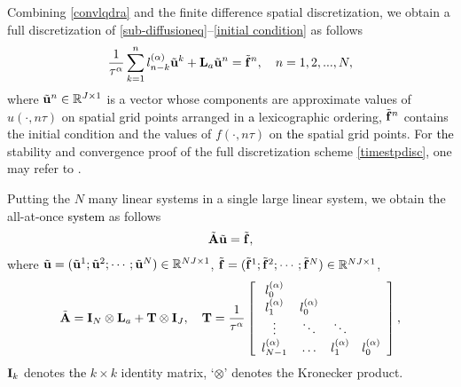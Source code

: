 \documentclass[11pt]{article}%
\numberwithin{equation}{section}
\begin{document}
Combining \eqref{convlqdra} and the finite difference spatial discretization, we obtain a full discretization of \eqref{sub-diffusioneq}--\eqref{initial condition} as follows
\begin{equation}\label{timestpdisc}
\frac{1}{\tau^\alpha}\sum\limits_{k=1}^{n}l_{n-k}^{(\alpha)}\tilde{\bf u}^k+{\bf L}_a\tilde{\bf u}^n=\tilde{\bf f}^n,\quad  n=1,2,...,N,
\end{equation}
where $\tilde{\bf u}^n\in\mathbb{R}^{J\times 1}$ is a vector whose components are approximate values of $u(\cdot,n\tau)$ on spatial grid points arranged in \textcolor{black}{a} lexicographic ordering, $\tilde{\bf f}^n$ contains the initial condition and the values of $f(\cdot,n\tau)$ on \textcolor{black}{the} spatial grid points. 
For \textcolor{black}{the} stability and convergence proof of the full discretization scheme \eqref{timestpdisc}, one may refer to \cite{zhang2011alternating,jin2016analysis,liao2018sharp}.

Putting the $N$ many linear systems in a single large linear system, we obtain the all-at-once \textcolor{black}{system} as follows
\begin{align}\label{allatoncesysts}
\tilde{\bf A}\tilde{\bf u}=\tilde{\bf f},
\end{align}
where $\tilde{\bf u}=(\tilde{\bf u}^{1};\tilde{\bf u}^{2};\cdots;\tilde{\bf u}^{N})\in\mathbb{R}^{NJ\times 1}$, $\tilde{\bf f}=(\tilde{\bf f}^{1};\tilde{\bf f}^{2};\cdots;\tilde{\bf f}^{N})\in\mathbb{R}^{NJ\times 1}$,
\begin{align*}
	\tilde{\bf A}={\bf I}_{N}\otimes{\bf L}_a+{\bf T}\otimes{\bf I}_{ J },\quad {\bf T}=\frac{1}{\tau^\alpha}\left[
	\begin{array}
		[c]{cccc}
		l_{0}^{(\alpha)} &       &  &\\
		l_{1}^{( \alpha)}& l_{0}^{(\alpha)} &  &\\
		\vdots&\ddots &\ddots&\\
		l_{N-1}^{( \alpha)}& \ldots & l_{1}^{( \alpha)} & l_{0}^{(\alpha)}
	\end{array}
	\right],
\end{align*}
${\bf I}_k$ denotes \textcolor{black}{the} $k\times k$ identity matrix, `$\otimes$' denotes the Kronecker product.
\end{document}
